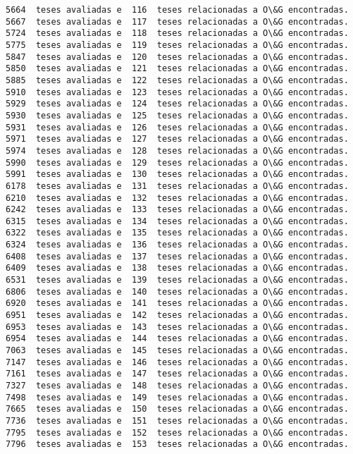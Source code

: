 \documentclass[11pt]{article}
\begin{document}
\begin{Verbatim}[commandchars=\\\{\}]
5664  teses avaliadas e  116  teses relacionadas a O\&G encontradas.
5667  teses avaliadas e  117  teses relacionadas a O\&G encontradas.
5724  teses avaliadas e  118  teses relacionadas a O\&G encontradas.
5775  teses avaliadas e  119  teses relacionadas a O\&G encontradas.
5847  teses avaliadas e  120  teses relacionadas a O\&G encontradas.
5850  teses avaliadas e  121  teses relacionadas a O\&G encontradas.
5885  teses avaliadas e  122  teses relacionadas a O\&G encontradas.
5910  teses avaliadas e  123  teses relacionadas a O\&G encontradas.
5929  teses avaliadas e  124  teses relacionadas a O\&G encontradas.
5930  teses avaliadas e  125  teses relacionadas a O\&G encontradas.
5931  teses avaliadas e  126  teses relacionadas a O\&G encontradas.
5971  teses avaliadas e  127  teses relacionadas a O\&G encontradas.
5974  teses avaliadas e  128  teses relacionadas a O\&G encontradas.
5990  teses avaliadas e  129  teses relacionadas a O\&G encontradas.
5991  teses avaliadas e  130  teses relacionadas a O\&G encontradas.
6178  teses avaliadas e  131  teses relacionadas a O\&G encontradas.
6210  teses avaliadas e  132  teses relacionadas a O\&G encontradas.
6242  teses avaliadas e  133  teses relacionadas a O\&G encontradas.
6315  teses avaliadas e  134  teses relacionadas a O\&G encontradas.
6322  teses avaliadas e  135  teses relacionadas a O\&G encontradas.
6324  teses avaliadas e  136  teses relacionadas a O\&G encontradas.
6408  teses avaliadas e  137  teses relacionadas a O\&G encontradas.
6409  teses avaliadas e  138  teses relacionadas a O\&G encontradas.
6531  teses avaliadas e  139  teses relacionadas a O\&G encontradas.
6806  teses avaliadas e  140  teses relacionadas a O\&G encontradas.
6920  teses avaliadas e  141  teses relacionadas a O\&G encontradas.
6951  teses avaliadas e  142  teses relacionadas a O\&G encontradas.
6953  teses avaliadas e  143  teses relacionadas a O\&G encontradas.
6954  teses avaliadas e  144  teses relacionadas a O\&G encontradas.
7063  teses avaliadas e  145  teses relacionadas a O\&G encontradas.
7147  teses avaliadas e  146  teses relacionadas a O\&G encontradas.
7161  teses avaliadas e  147  teses relacionadas a O\&G encontradas.
7327  teses avaliadas e  148  teses relacionadas a O\&G encontradas.
7498  teses avaliadas e  149  teses relacionadas a O\&G encontradas.
7665  teses avaliadas e  150  teses relacionadas a O\&G encontradas.
7736  teses avaliadas e  151  teses relacionadas a O\&G encontradas.
7795  teses avaliadas e  152  teses relacionadas a O\&G encontradas.
7796  teses avaliadas e  153  teses relacionadas a O\&G encontradas.

\end{Verbatim}
\end{document}
